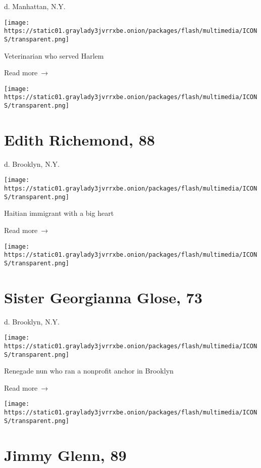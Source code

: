 d. Manhattan, N.Y.

\texttt{[image: https://static01.graylady3jvrrxbe.onion/packages/flash/multimedia/ICONS/transparent.png]}

Veterinarian who served Harlem

 Read more~→

\href{https://www.nytimes3xbfgragh.onion/2020/05/12/obituaries/edith-richmond-dead-coronavirus.html}{}

\texttt{[image: https://static01.graylady3jvrrxbe.onion/packages/flash/multimedia/ICONS/transparent.png]}

\hypertarget{edith-richemond-88}{%
\section{Edith Richemond, 88}\label{edith-richemond-88}}

d. Brooklyn, N.Y.

\texttt{[image: https://static01.graylady3jvrrxbe.onion/packages/flash/multimedia/ICONS/transparent.png]}

Haitian immigrant with a big heart

 Read more~→

\href{https://www.nytimes3xbfgragh.onion/2020/05/12/obituaries/sister-georgianna-glose-dead-coronavirus.html}{}

\texttt{[image: https://static01.graylady3jvrrxbe.onion/packages/flash/multimedia/ICONS/transparent.png]}

\hypertarget{sister-georgianna-glose-73}{%
\section{Sister Georgianna Glose, 73}\label{sister-georgianna-glose-73}}

d. Brooklyn, N.Y.

\texttt{[image: https://static01.graylady3jvrrxbe.onion/packages/flash/multimedia/ICONS/transparent.png]}

Renegade nun who ran a nonprofit anchor in Brooklyn

 Read more~→

\href{https://www.nytimes3xbfgragh.onion/2020/05/09/nyregion/jimmy-glenn-dead-coronavirus.html}{}

\texttt{[image: https://static01.graylady3jvrrxbe.onion/packages/flash/multimedia/ICONS/transparent.png]}

\hypertarget{jimmy-glenn-89}{%
\section{Jimmy Glenn, 89}\label{jimmy-glenn-89}}

